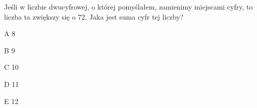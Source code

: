 \begin{tresc}
Jeśli w liczbie dwucyfrowej, o której pomyślałem, zamienimy miejscami cyfry, to liczba ta zwiększy się o 72. Jaka jest suma cyfr tej liczby?
\end{tresc}
\begin{wariant}{A} 8 \end{wariant}
\begin{wariant}{B} 9 \end{wariant}
\begin{wariant}{C} 10 \end{wariant}
\begin{wariant}{D} 11 \end{wariant}
\begin{wariant}{E} 12 \end{wariant}
